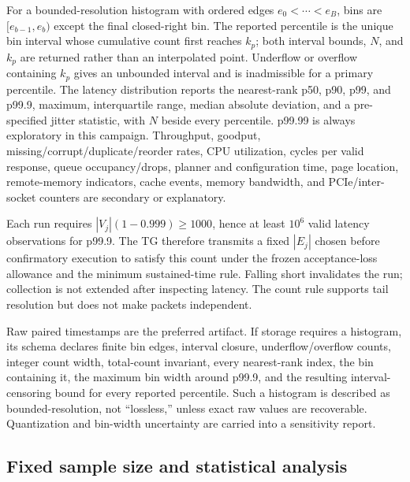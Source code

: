For a bounded-resolution histogram with ordered edges $e_0<\cdots<e_B$, bins are $[e_{b-1},e_b)$ except the final closed-right bin. The reported percentile is the unique bin interval whose cumulative count first reaches $k_p$; both interval bounds, $N$, and $k_p$ are returned rather than an interpolated point. Underflow or overflow containing $k_p$ gives an unbounded interval and is inadmissible for a primary percentile. The latency distribution reports the nearest-rank p50, p90, p99, and p99.9, maximum, interquartile range, median absolute deviation, and a pre-specified jitter statistic, with $N$ beside every percentile. p99.99 is always exploratory in this campaign. Throughput, goodput, missing/corrupt/duplicate/reorder rates, CPU utilization, cycles per valid response, queue occupancy/drops, planner and configuration time, page location, remote-memory indicators, cache events, memory bandwidth, and PCIe/inter-socket counters are secondary or explanatory.

Each run requires $|V_j|(1-0.999)\geq1000$, hence at least $10^6$ valid latency observations for p99.9. The TG therefore transmits a fixed $|E_j|$ chosen before confirmatory execution to satisfy this count under the frozen acceptance-loss allowance and the minimum sustained-time rule. Falling short invalidates the run; collection is not extended after inspecting latency. The count rule supports tail resolution but does not make packets independent.

Raw paired timestamps are the preferred artifact. If storage requires a histogram, its schema declares finite bin edges, interval closure, underflow/overflow counts, integer count width, total-count invariant, every nearest-rank index, the bin containing it, the maximum bin width around p99.9, and the resulting interval-censoring bound for every reported percentile. Such a histogram is described as bounded-resolution, not “lossless,” unless exact raw values are recoverable. Quantization and bin-width uncertainty are carried into a sensitivity report.

\subsection{Fixed sample size and statistical analysis}

